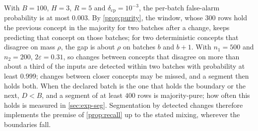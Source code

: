 \begin{remark}
With $B=100$, $H=3$, $R=5$ and $\delta_{\mathrm{cp}}=10^{-3}$, the per-batch false-alarm probability is at
most $0.003$. By \cref{prop:purity}, the window, whose $300$ rows hold the previous concept in the majority for two
batches after a change, keeps predicting that concept on those batches; for two deterministic concepts that disagree
on mass $\rho$, the gap is about $\rho$ on batches $b$ and $b+1$. With $n_1=500$ and $n_2=200$,
$2\varepsilon=0.31$, so changes between concepts that disagree on more than about a third of the inputs are detected
within two batches with probability at least $0.999$; changes between closer concepts may be missed, and a
segment then holds both. When the declared batch is the one that holds the boundary or the next, $D<B$, and a segment of at least
$400$ rows is majority-pure; how often this holds is measured in \cref{sec:exp-seg}. Segmentation by detected changes therefore implements the premise
of \cref{prop:recall} up to the stated mixing, wherever the boundaries fall.
\end{remark}

